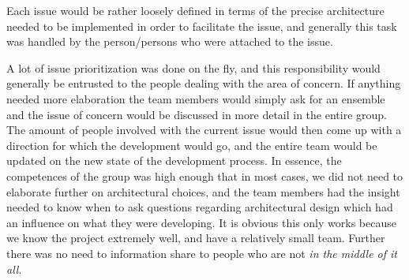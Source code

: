 Each issue would be rather loosely defined in terms of the precise architecture needed to be implemented in order to facilitate the issue, and generally this task was handled by the person/persons who were attached to the issue. 

A lot of issue prioritization was done on the fly, and this responsibility would generally be entrusted to the people dealing with the area of concern. If anything needed more elaboration the team members would simply ask for an ensemble and the issue of concern would be discussed in more detail in the entire group. The amount of people involved with the current issue would then come up with a direction for which the development would go, and the entire team would be updated on the new state of the development process. In essence, the competences of the group was high enough that in most cases, we did not need to elaborate further on architectural choices, and the team members had the insight needed to know when to ask questions regarding architectural design which had an influence on what they were developing. 
It is obvious this only works because we know the project extremely well, and have a relatively small team. Further there was no need to information share to people who are not \emph{in the middle of it all}.